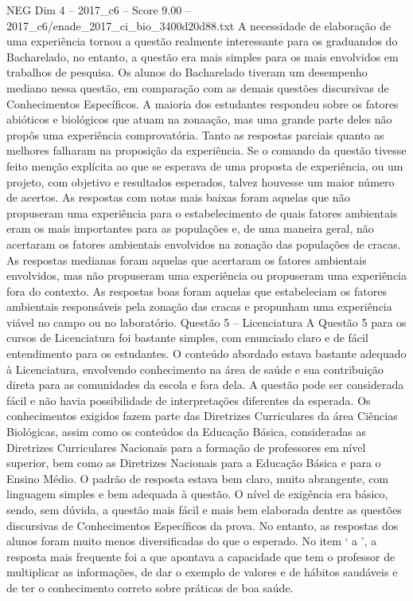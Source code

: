 \begin{textsample}{NEG Dim 4 – 2017\_c6 – Score 9.00 – 2017\_c6/enade\_2017\_ci\_bio\_3400d20d88.txt}
A necessidade de elaboração de uma experiência tornou a questão realmente interessante para os graduandos do Bacharelado, no entanto, a questão era mais simples para os mais envolvidos em trabalhos de pesquisa.
Os alunos do Bacharelado tiveram um desempenho mediano nessa questão, em comparação com as demais questões discursivas de Conhecimentos Específicos.
A maioria dos estudantes respondeu sobre os fatores abióticos e biológicos que atuam na zonaação, mas uma grande parte deles não propôs uma experiência comprovatória.
Tanto as respostas parciais quanto as melhores falharam na proposição da experiência.
Se o comando da questão tivesse feito menção explícita ao que se esperava de uma proposta de experiência, ou um projeto, com objetivo e resultados esperados, talvez houvesse um maior número de acertos.
As respostas com notas mais baixas foram aquelas que não propuseram uma experiência para o estabelecimento de quais fatores ambientais eram os mais importantes para as populações e, de uma maneira geral, não acertaram os fatores ambientais envolvidos na zonação das populações de cracas.
As respostas medianas foram aquelas que acertaram os fatores ambientais envolvidos, mas não propuseram uma experiência ou propuseram uma experiência fora do contexto.
As respostas boas foram aquelas que estabeleciam os fatores ambientais responsáveis pela zonação das cracas e propunham uma experiência viável no campo ou no laboratório.
Questão 5 – Licenciatura A Questão 5 para os cursos de Licenciatura foi bastante simples, com enunciado claro e de fácil entendimento para os estudantes.
O conteúdo abordado estava bastante adequado à Licenciatura, envolvendo conhecimento na área de saúde e sua contribuição direta para as comunidades da escola e fora dela.
A questão pode ser considerada fácil e não havia possibilidade de interpretações diferentes da esperada.
Os conhecimentos exigidos fazem parte das Diretrizes Curriculares da área Ciências Biológicas, assim como os conteúdos da Educação Básica, consideradas as Diretrizes Curriculares Nacionais para a formação de professores em nível superior, bem como as Diretrizes Nacionais para a Educação Básica e para o Ensino Médio.
O padrão de resposta estava bem claro, muito abrangente, com linguagem simples e bem adequada à questão.
O nível de exigência era básico, sendo, sem dúvida, a questão mais fácil e mais bem elaborada dentre as questões discursivas de Conhecimentos Específicos da prova.
No entanto, as respostas dos alunos foram muito menos diversificadas do que o esperado.
No item ‘ a ’, a resposta mais frequente foi a que apontava a capacidade que tem o professor de multiplicar as informações, de dar o exemplo de valores e de hábitos saudáveis e de ter o conhecimento correto sobre práticas de boa saúde.

\end{textsample}
